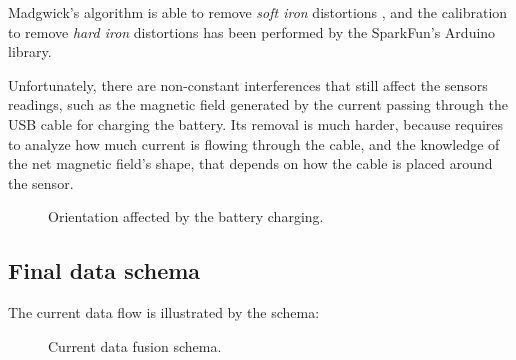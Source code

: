 Madgwick's algorithm is able to remove \textit{soft iron} distortions \cite[11-12]{Mad10}, and the calibration to remove \textit{hard iron} distortions has been performed by the SparkFun's Arduino library.
\bigbreak

Unfortunately, there are non-constant interferences that still affect the sensors readings, such as the magnetic field generated by the current passing through the USB cable for charging the battery.
Its removal is much harder, because requires to analyze how much current is flowing through the cable, and the knowledge of the net magnetic field's shape, that depends on how the cable is placed around the sensor.

\begin{center}
	\begin{figure}[ht]
		\caption{Orientation affected by the battery charging.}
	\end{figure}
\end{center}

\subsection{Final data schema}
The current data flow is illustrated by the schema:

\begin{center}
	\begin{figure}[ht]
		\caption{Current data fusion schema.}
	\end{figure}
\end{center}
